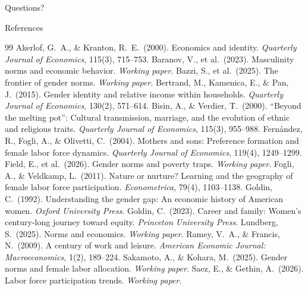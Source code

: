 \documentclass[10pt,aspectratio=169]{beamer}
\begin{document}
\begin{frame}[standout]
  Questions?
\end{frame}

\begin{frame}[allowframebreaks]{References}
  \footnotesize
  \begin{thebibliography}{99}
      Akerlof, G.\ A., \& Kranton, R.\ E.\ (2000).
      Economics and identity.
      \textit{Quarterly Journal of Economics}, 115(3), 715--753.
      Baranov, V., et al.\ (2023).
      Masculinity norms and economic behavior.
      \textit{Working paper}.
      Bazzi, S., et al.\ (2025).
      The frontier of gender norms.
      \textit{Working paper}.
      Bertrand, M., Kamenica, E., \& Pan, J.\ (2015).
      Gender identity and relative income within households.
      \textit{Quarterly Journal of Economics}, 130(2), 571--614.
      Bisin, A., \& Verdier, T.\ (2000).
      ``Beyond the melting pot'': Cultural transmission, marriage, and
      the evolution of ethnic and religious traits.
      \textit{Quarterly Journal of Economics}, 115(3), 955--988.
      Fern\'{a}ndez, R., Fogli, A., \& Olivetti, C.\ (2004).
      Mothers and sons: Preference formation and female labor force dynamics.
      \textit{Quarterly Journal of Economics}, 119(4), 1249--1299.
      Field, E., et al.\ (2026).
      Gender norms and poverty traps.
      \textit{Working paper}.
      Fogli, A., \& Veldkamp, L.\ (2011).
      Nature or nurture? Learning and the geography of female labor force
      participation.
      \textit{Econometrica}, 79(4), 1103--1138.
      Goldin, C.\ (1992).
      Understanding the gender gap: An economic history of American women.
      \textit{Oxford University Press}.
      Goldin, C.\ (2023).
      Career and family: Women's century-long journey toward equity.
      \textit{Princeton University Press}.
      Lundberg, S.\ (2025).
      Norms and economics.
      \textit{Working paper}.
      Ramey, V.\ A., \& Francis, N.\ (2009).
      A century of work and leisure.
      \textit{American Economic Journal: Macroeconomics}, 1(2), 189--224.
      Sakamoto, A., \& Kohara, M.\ (2025).
      Gender norms and female labor allocation.
      \textit{Working paper}.
      Saez, E., \& Gethin, A.\ (2026).
      Labor force participation trends.
      \textit{Working paper}.
  \end{thebibliography}
\end{frame}
\end{document}
